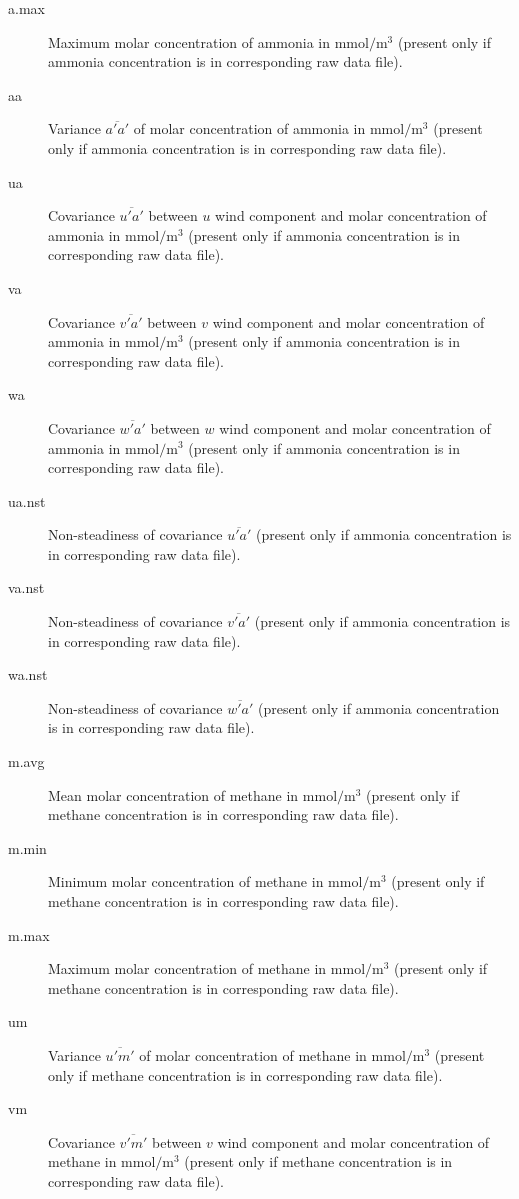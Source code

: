 \documentclass[a4paper,10pt]{book}
\begin{document}
\begin{description}
 \item[a.max] Maximum molar concentration of ammonia in $\mbox{mmol}/\mbox{m}^{3}$ (present only if ammonia concentration is in corresponding raw data file).
 \item[aa] Variance $\overline{a'a'}$ of molar concentration of ammonia in $\mbox{mmol}/\mbox{m}^{3}$ (present only if ammonia concentration is in corresponding raw data file).
 \item[ua] Covariance $\overline{u'a'}$ between $u$ wind component and molar concentration of ammonia in $\mbox{mmol}/\mbox{m}^{3}$ (present only if ammonia concentration is in corresponding raw data file).
 \item[va] Covariance $\overline{v'a'}$ between $v$ wind component and molar concentration of ammonia in $\mbox{mmol}/\mbox{m}^{3}$ (present only if ammonia concentration is in corresponding raw data file).
 \item[wa] Covariance $\overline{w'a'}$ between $w$ wind component and molar concentration of ammonia in $\mbox{mmol}/\mbox{m}^{3}$ (present only if ammonia concentration is in corresponding raw data file).
 \item[ua.nst] Non-steadiness of covariance $\overline{u'a'}$ (present only if ammonia concentration is in corresponding raw data file).
 \item[va.nst] Non-steadiness of covariance $\overline{v'a'}$ (present only if ammonia concentration is in corresponding raw data file).
 \item[wa.nst] Non-steadiness of covariance $\overline{w'a'}$ (present only if ammonia concentration is in corresponding raw data file).
 \item[m.avg] Mean molar concentration of methane in $\mbox{mmol}/\mbox{m}^{3}$ (present only if methane concentration is in corresponding raw data file).
 \item[m.min] Minimum molar concentration of methane in $\mbox{mmol}/\mbox{m}^{3}$ (present only if methane concentration is in corresponding raw data file).
 \item[m.max] Maximum molar concentration of methane in $\mbox{mmol}/\mbox{m}^{3}$ (present only if methane concentration is in corresponding raw data file).
 \item[um] Variance $\overline{u'm'}$ of molar concentration of methane in $\mbox{mmol}/\mbox{m}^{3}$ (present only if methane concentration is in corresponding raw data file).
 \item[vm] Covariance $\overline{v'm'}$ between $v$ wind component and molar concentration of methane in $\mbox{mmol}/\mbox{m}^{3}$ (present only if methane concentration is in corresponding raw data file).

\end{description}
\end{document}
